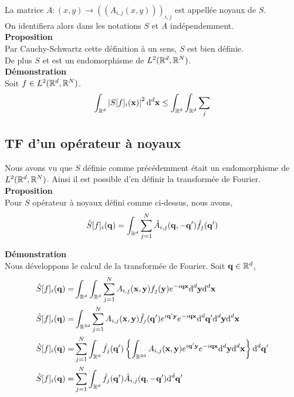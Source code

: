 \documentclass[10pt]{article}
\begin{document}
 La matrice $A : (x,y) \rightarrow ((A_{i,j}(x,y)))_{i,j}$ est appellée noyaux de $S$. \\
 On identifiera alors dans les notations $S$ et $A$ indépendemment. \\

\textbf{Proposition}\\
Par Cauchy-Schwartz cette définition à un sens, $S$ est bien définie. \\
De plus $S$ et est un endomorphisme de $L^2(\mathbb{R}^d, \mathbb{R}^N)$. \\

\textbf{Démonstration}\\
Soit $f\in L^2(\mathbb{R}^d, \mathbb{R}^N)$.\\

\begin{equation}
   \int_{\mathbb{R}^d} \left| S[f]_i ({\bf x}) \right|^{2} \text{d}^d {\bf x} \le \int_{\mathbb{R}^d} \int_{\mathbb{R}^d} \sum_j 
\end{equation}


\vspace*{11pt}

\subsection{TF d'un opérateur à noyaux}

Nous avons vu que $S$ définie comme précédemment était un endomorphisme de $L^2(\mathbb{R}^d, \mathbb{R}^N)$. Ainsi il est possible d'en définir la transformée de Fourier. \\

\textbf{Proposition}\\
Pour $S$ opérateur à noyaux défini comme ci-dessus, nous avons,
\begin{equation}
  \hat{S}[f]_i({\bf q}) = \int_{\mathbb{R}^d} \sum_{j=1}^{N} \hat{A}_{i,j}({\bf q}, -{\bf q}') \hat{f}_j({\bf q}')
\end{equation}



\textbf{Démonstration}\\
Nous développons le calcul de la transformée de Fourier. Soit ${\bf q} \in \mathbb{R}^d$,
\begin{align}
 \hat{S}[f]_i({\bf q})  = & \int_{\mathbb{R}^d} \int_{\mathbb{R}^d} \sum_{j=1}^{N} A_{i,j}({\bf x},{\bf y})f_j({\bf y}) e^{-i{\bf q}{\bf x}} \text{d}^d {\bf y} \text{d}^d {\bf x} \\
 \hat{S}[f]_i({\bf q})  = & \int_{\mathbb{R}^{3d}} \sum_{j=1}^{N} A_{i,j}({\bf x},{\bf y}) \hat{f}_j({\bf q}') e^{i{\bf q}'{\bf y}} e^{- i{\bf q}{\bf x}}  \text{d}^d {\bf q}' \text{d}^d {\bf y} \text{d}^d {\bf x} \\
 \hat{S}[f]_i({\bf q})  = &    \sum_{j=1}^{N} \int_{\mathbb{R}^d} \hat{f}_j({\bf q}') \left\{ \int_{\mathbb{R}^{2d}} A_{i,j}({\bf x},{\bf y})  e^{i{\bf q}'{\bf y}} e^{- i{\bf q}{\bf x}}  \text{d}^d {\bf y} \text{d}^d {\bf x}   \right\} \text{d}^d {\bf q}'\\
\hat{S}[f]_i({\bf q})  = &    \sum_{j=1}^{N} \int_{\mathbb{R}^d} \hat{f}_j({\bf q}') \hat{A}_{i,j}({\bf q}, -{\bf q}') \text{d}^d {\bf q}'\\
\end{align}
\end{document}
